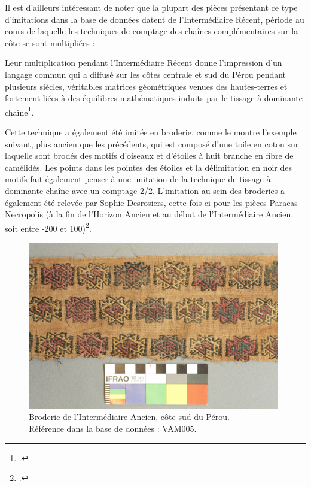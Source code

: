 Il est d'ailleurs intéressant de noter que la plupart des pièces présentant ce type d'imitations dans la base de données datent de l'Intermédiaire Récent, période au cours de laquelle les techniques de comptage des chaînes complémentaires sur la côte se sont multipliées : 
\begin{citer}
Leur multiplication pendant l'Intermédiaire Récent donne l'impression d'un langage commun qui a diffusé sur les côtes centrale et sud du Pérou pendant plusieurs siècles, véritables matrices géométriques venues des hautes-terres et fortement liées à des équilibres mathématiques induits par le tissage à dominante chaîne\footcite[p.~61]{desrosiersMatieresPremieresSavoirs2018}.
\end{citer}

\noindent Cette technique a également été imitée en broderie, comme le montre l'exemple suivant, plus ancien que les précédents, qui est composé d'une toile en coton sur laquelle sont brodés des motifs d'oiseaux et d'étoiles à huit branche en fibre de camélidés. Les points dans les pointes des étoiles et la délimitation en noir des motifs fait également penser à une imitation de la technique de tissage à dominante chaîne avec un comptage 2/2. L'imitation au sein des broderies a également été relevée par Sophie Desrosiers, cette fois-ci pour les pièces Paracas Necropolis (à la fin de l'Horizon Ancien et au début de l'Intermédiaire Ancien, soit entre -200 et 100)\footcite[p.~2]{desrosiersReexamenTuniqueOcucaje2010}. 

\begin{figure}[!ht]
       \begin{center}
        		\includegraphics[width=11cm]{../images/VAM005.jpg}
	\end{center}
    \caption{Broderie de l'Intermédiaire Ancien, côte sud du Pérou.\\ Référence dans la base de données : VAM005.}
    \label{fig:VAM005}
\end{figure}


